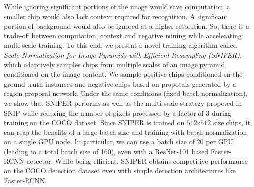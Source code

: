\documentclass{article}
\begin{document}
While ignoring significant portions of the image would save computation, a smaller chip would also lack context required for recognition. A significant portion of background would also be ignored at a higher resolution. So, there is a trade-off between computation, context and negative mining while accelerating multi-scale training. To this end, we present a novel training algorithm called \textit{Scale Normalization for Image Pyramids with Efficient Resampling (SNIPER)}, which adaptively samples chips from multiple scales of an image pyramid, conditioned on the image content. We sample positive chips conditioned on the ground-truth instances and negative chips based on proposals generated by a region proposal network. Under the same conditions (fixed batch normalization), we show that SNIPER performs as well as the multi-scale strategy proposed in SNIP \cite{singh2017analysis} while reducing the number of pixels processed by a factor of $3$ during training on the COCO dataset. Since SNIPER is trained on $512$x$512$ size chips, it can reap the benefits of a large batch size and training with batch-normalization on a single GPU node. In particular, we can use a batch size of $20$ per GPU (leading to a total batch size of 160), even with a ResNet-101 based Faster-RCNN detector. While being efficient, SNIPER obtains competitive performance on the COCO detection dataset even with simple detection architectures like Faster-RCNN. %
\end{document}
